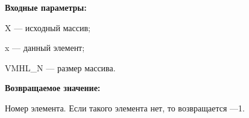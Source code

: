 \textbf{Входные параметры:}

X --- исходный массив;
 
x --- данный элемент;
 
VMHL\_N --- размер массива.

\textbf{Возвращаемое значение:}
 
Номер элемента. Если такого элемента нет, то возвращается ---1.